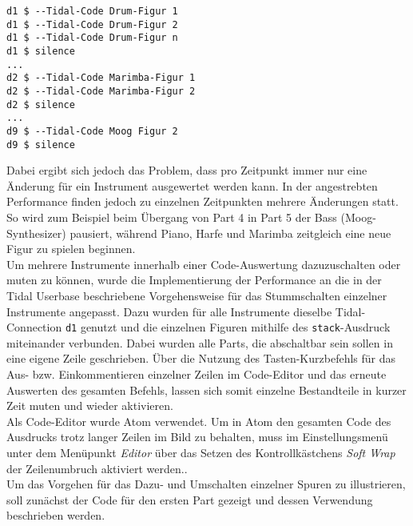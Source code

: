 \documentclass[
10pt, %
a4paper, %
oneside, %
headinclude,footinclude, %
BCOR5mm, %
]{scrartcl}
\begin{document}
\begin{lstlisting}
d1 $ --Tidal-Code Drum-Figur 1
d1 $ --Tidal-Code Drum-Figur 2
d1 $ --Tidal-Code Drum-Figur n
d1 $ silence
...
d2 $ --Tidal-Code Marimba-Figur 1
d2 $ --Tidal-Code Marimba-Figur 2
d2 $ silence
...
d9 $ --Tidal-Code Moog Figur 2
d9 $ silence
\end{lstlisting}

\noindent Dabei ergibt sich jedoch das Problem, dass pro Zeitpunkt immer nur eine Änderung für ein Instrument ausgewertet werden kann. In der angestrebten Performance finden jedoch zu einzelnen Zeitpunkten mehrere Änderungen statt. So wird zum Beispiel beim Übergang von Part 4 in Part 5 der Bass (Moog-Synthesizer) pausiert, während Piano, Harfe und Marimba zeitgleich eine neue Figur zu spielen beginnen.\\

\noindent Um mehrere Instrumente innerhalb einer Code-Auswertung dazuzuschalten oder muten zu können, wurde die Implementierung der Performance an die in der Tidal Userbase beschriebene Vorgehensweise für das Stummschalten einzelner Instrumente angepasst.\cite{tid13} Dazu wurden für alle Instrumente dieselbe Tidal-Connection \verb|d1| genutzt und die einzelnen Figuren mithilfe des \verb|stack|-Ausdruck miteinander verbunden. Dabei wurden alle Parts, die abschaltbar sein sollen in eine eigene Zeile geschrieben. Über die Nutzung des Tasten-Kurzbefehls für das Aus- bzw. Einkommentieren einzelner Zeilen im Code-Editor und das erneute Auswerten des gesamten Befehls, lassen sich somit einzelne Bestandteile in kurzer Zeit muten und wieder aktivieren.\\
Als Code-Editor wurde Atom verwendet. Um in Atom den gesamten Code des Ausdrucks trotz langer Zeilen im Bild zu behalten, muss im Einstellungsmenü unter dem Menüpunkt \textit{Editor} über das Setzen des Kontrollkästchens \textit{Soft Wrap} der Zeilenumbruch aktiviert werden.\cite{atom1}. \\

\noindent Um das Vorgehen für das Dazu- und Umschalten einzelner Spuren zu illustrieren, soll zunächst der Code für den ersten Part gezeigt und dessen Verwendung beschrieben werden.

\lstset{
	numbers=left,
}

\end{document}

